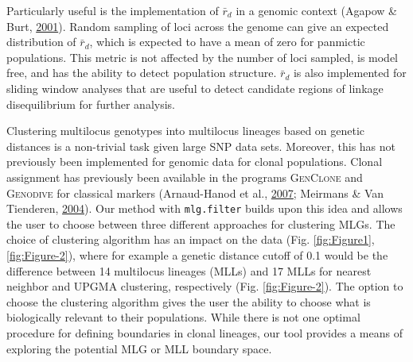 \documentclass[double,11pt]{beavtex}
\begin{document}
  Particularly useful is the implementation of \(\bar{r}_d\) in a genomic
  context (Agapow \& Burt, \protect\hyperlink{ref-Agapow_2001}{2001}).
  Random sampling of loci across the genome can give an expected
  distribution of \(\bar{r}_d\), which is expected to have a mean of zero
  for panmictic populations. This metric is not affected by the number of
  loci sampled, is model free, and has the ability to detect population
  structure. \(\bar{r}_d\) is also implemented for sliding window analyses
  that are useful to detect candidate regions of linkage disequilibrium
  for further analysis.
  
  Clustering multilocus genotypes into multilocus lineages based on
  genetic distances is a non-trivial task given large SNP data sets.
  Moreover, this has not previously been implemented for genomic data for
  clonal populations. Clonal assignment has previously been available in
  the programs \textsc{GenClone} and \textsc{Genodive} for classical
  markers (Arnaud-Hanod et al.,
  \protect\hyperlink{ref-arnaud2007standardizing}{2007}; Meirmans \& Van
  Tienderen, \protect\hyperlink{ref-meirmans2004genotype}{2004}). Our
  method with \texttt{mlg.filter} builds upon this idea and allows the
  user to choose between three different approaches for clustering MLGs.
  The choice of clustering algorithm has an impact on the data (Fig.
  \ref{fig:Figure1}, \ref{fig:Figure-2}), where for example a genetic
  distance cutoff of 0.1 would be the difference between 14 multilocus
  lineages (MLLs) and 17 MLLs for nearest neighbor and UPGMA clustering,
  respectively (Fig. \ref{fig:Figure-2}). The option to choose the
  clustering algorithm gives the user the ability to choose what is
  biologically relevant to their populations. While there is not one
  optimal procedure for defining boundaries in clonal lineages, our tool
  provides a means of exploring the potential MLG or MLL boundary space.
  
\end{document}
